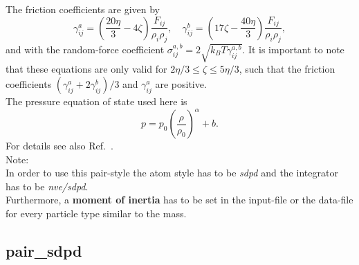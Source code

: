The friction coefficients are given by
%
\begin{equation} 
	\gamma_{ij}^a = \left( \frac{20\eta}{3}-4\zeta \right)\frac{F_{ij}}{\rho_i\rho_j}, \quad \gamma_{ij}^b = \left( 17\zeta - \frac{40\eta}{3} \right)\frac{F_{ij}}{\rho_i\rho_j},
\end{equation}
% 
and with the random-force coefficient $\sigma_{ij}^{a,b} = 2\sqrt{k_BT\gamma_{ij}^{a,b}}$.
It is important to note that these equations are only valid for $2\eta/3 \le \zeta \le 5\eta /3$, such that the friction coefficients $(\gamma_{ij}^a + 2\gamma_{ij}^b)/3$ and  $\gamma_{ij}^a$ are positive.\\
%
The pressure equation of state used here is
\begin{equation}\label{eq:pressure}
p = p_0 \left( \frac{\rho}{\rho_0} \right)^{\alpha} + b.
\end{equation}
For details see also Ref.~\cite{Mueller_SDPD_2015}.\\[2ex]
Note:\\
In order to use this pair-style the atom style has to be \textit{sdpd} and the integrator has to be \textit{nve/sdpd}.\\
Furthermore, a \textbf{moment of inertia} has to be set in the input-file or the data-file for every particle type similar to the mass.


\subsection{pair\_sdpd}\label{sec:pair/sdpd}

